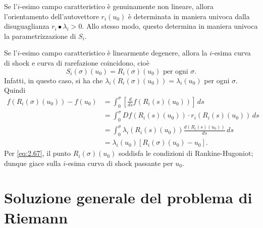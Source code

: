 \begin{osservazione}
    Se l'$i$-esimo campo caratteristico è genuinamente non lineare, allora l'orientamento dell'autovettore $r_{i}(u_{0})$ è determinata in maniera univoca dalla disuguaglianza $r_{i}\bullet\lambda_{i}>0$. Allo stesso modo, questo determina in maniera univoca la parametrizzazione di $S_{i}$.
\end{osservazione}
\begin{osservazione}
    Se l'$i$-esimo campo caratteristico è linearmente degenere, allora la $i$-esima curva di shock e curva di rarefazione coincidono, cioè
    \begin{equation}\label{eq:2.66}
        S_{i}(\sigma)(u_{0})=R_{i}(\sigma)(u_{0}) \text{ per ogni }\sigma.
    \end{equation}
    Infatti, in questo caso, si ha che $\lambda_{i}(R_{i}(\sigma)(u_{0}))=\lambda_{i}(u_{0})$ per ogni $\sigma$. Quindi
    \begin{align}\label{eq:2.67}
        f(R_{i}(\sigma)(u_{0}))-f(u_{0}) &= \int_{0}^{\sigma}\left[\frac{d}{ds}f(R_{i}(s)(u_{0}))\right]\,ds\nonumber\\
        &=\int_{0}^{\sigma}Df(R_{i}(s)(u_{0}))\cdot r_{i}(R_{i}(s)(u_{0}))\,ds\nonumber\\
        &=\int_{0}^{\sigma}\lambda_{i}(R_{i}(s)(u_{0}))\frac{d(R_{i}(s)(u_{0}))}{ds}\,ds\nonumber\\
        &=\lambda_{i}(u_{0})[R_{i}(\sigma)(u_{0})-u_{0}].
    \end{align}
    Per \eqref{eq:2.67}, il punto $R_{i}(\sigma)(u_{0})$ soddisfa le condizioni di Rankine-Hugoniot; dunque giace sulla $i$-esima curva di shock passante per $u_{0}$.
\end{osservazione}

\section{Soluzione generale del problema di Riemann}

